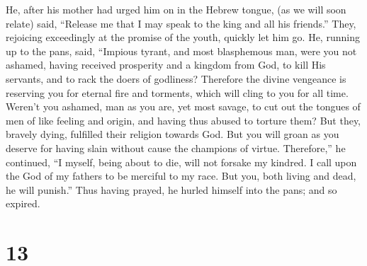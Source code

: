  He, after his mother had urged him on in the Hebrew tongue,
(as we will soon relate) said,  ``Release me that I may
speak to the king and all his friends.''  They, rejoicing
exceedingly at the promise of the youth, quickly let him go.
 He, running up to the pans, said,  ``Impious
tyrant, and most blasphemous man, were you not ashamed, having received
prosperity and a kingdom from God, to kill His servants, and to rack the
doers of godliness?  Therefore the divine vengeance is
reserving you for eternal fire and torments, which will cling to you for
all time.  Weren't you ashamed, man as you are, yet most
savage, to cut out the tongues of men of like feeling and origin, and
having thus abused to torture them?  But they, bravely
dying, fulfilled their religion towards God.  But you will
groan as you deserve for having slain without cause the champions of
virtue.  Therefore,'' he continued, ``I myself, being about
to die,  will not forsake my kindred.  I call
upon the God of my fathers to be merciful to my race.  But
you, both living and dead, he will punish.''  Thus having
prayed, he hurled himself into the pans; and so expired.

\hypertarget{section-12}{%
\section{13}\label{section-12}}

